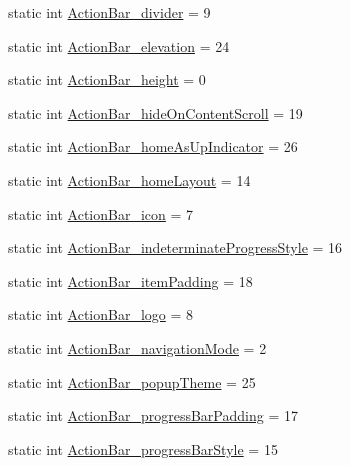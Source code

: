 \begin{DoxyCompactItemize}
\item 
static int \hyperlink{classandroid_1_1support_1_1v4_1_1R_1_1styleable_ac3707487601420af47218613124bf864}{Action\+Bar\+\_\+divider} = 9
\item 
static int \hyperlink{classandroid_1_1support_1_1v4_1_1R_1_1styleable_af9188f37272bce5af588009089023764}{Action\+Bar\+\_\+elevation} = 24
\item 
static int \hyperlink{classandroid_1_1support_1_1v4_1_1R_1_1styleable_a96d9c1a905653113d5071864c6cabc6f}{Action\+Bar\+\_\+height} = 0
\item 
static int \hyperlink{classandroid_1_1support_1_1v4_1_1R_1_1styleable_a34d5eac32f5d297f42d6d9d3a885891b}{Action\+Bar\+\_\+hide\+On\+Content\+Scroll} = 19
\item 
static int \hyperlink{classandroid_1_1support_1_1v4_1_1R_1_1styleable_afcf7f4cdfdc06edf00b3dde2479d7702}{Action\+Bar\+\_\+home\+As\+Up\+Indicator} = 26
\item 
static int \hyperlink{classandroid_1_1support_1_1v4_1_1R_1_1styleable_abb8398bbec7921fb6596d6de854eb0cc}{Action\+Bar\+\_\+home\+Layout} = 14
\item 
static int \hyperlink{classandroid_1_1support_1_1v4_1_1R_1_1styleable_aaa9149c39fa694d73adbfce1bf7a2147}{Action\+Bar\+\_\+icon} = 7
\item 
static int \hyperlink{classandroid_1_1support_1_1v4_1_1R_1_1styleable_a044b37dfc919ff9fb71d66587fe8f559}{Action\+Bar\+\_\+indeterminate\+Progress\+Style} = 16
\item 
static int \hyperlink{classandroid_1_1support_1_1v4_1_1R_1_1styleable_a8548ce153987b04b5d4798301bc48594}{Action\+Bar\+\_\+item\+Padding} = 18
\item 
static int \hyperlink{classandroid_1_1support_1_1v4_1_1R_1_1styleable_aaa9284e4203b58e1c1be7d41138d3b94}{Action\+Bar\+\_\+logo} = 8
\item 
static int \hyperlink{classandroid_1_1support_1_1v4_1_1R_1_1styleable_a0f55fffd685c46c93b83a67738984c79}{Action\+Bar\+\_\+navigation\+Mode} = 2
\item 
static int \hyperlink{classandroid_1_1support_1_1v4_1_1R_1_1styleable_af119aa9f8a6ea23d2126ea383dabfecf}{Action\+Bar\+\_\+popup\+Theme} = 25
\item 
static int \hyperlink{classandroid_1_1support_1_1v4_1_1R_1_1styleable_abfc806e138832b59961a03dd3ea028a5}{Action\+Bar\+\_\+progress\+Bar\+Padding} = 17
\item 
static int \hyperlink{classandroid_1_1support_1_1v4_1_1R_1_1styleable_a8a084dd5197bac512fb1f451fe3c4f09}{Action\+Bar\+\_\+progress\+Bar\+Style} = 15

\end{DoxyCompactItemize}
